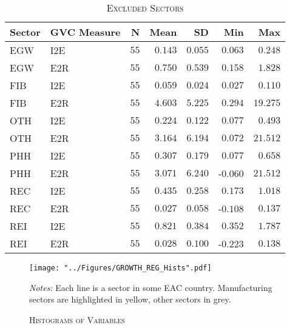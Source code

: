 \documentclass[a4paper]{article}
\begin{document}
\begin{table}[h!]  \vspace{-4mm}
  \centering 
  \caption{\label{tab:EXCL_SEC}\textsc{Excluded Sectors}}
  \vspace{2mm}
\begin{tabular}{ llrrrrr} \toprule
Sector & GVC Measure  & N & Mean & SD & Min & Max \\ 
\midrule
EGW & I2E & $55$ & $0.143$ & $0.055$ & $0.063$ & $0.248$ \\ 
EGW & E2R & $55$ & $0.750$ & $0.539$ & $0.158$ & $1.828$ \\ 
FIB & I2E & $55$ & $0.059$ & $0.024$ & $0.027$ & $0.110$ \\ 
FIB & E2R & $55$ & $4.603$ & $5.225$ & $0.294$ & $19.275$ \\ 
OTH & I2E & $55$ & $0.224$ & $0.122$ & $0.077$ & $0.493$ \\ 
OTH & E2R & $55$ & $3.164$ & $6.194$ & $0.072$ & $21.512$ \\ 
PHH & I2E & $55$ & $0.307$ & $0.179$ & $0.077$ & $0.658$ \\ 
PHH & E2R & $55$ & $3.071$ & $6.240$ & -$0.060$ & $21.512$ \\ 
REC & I2E & $55$ & $0.435$ & $0.258$ & $0.173$ & $1.018$ \\ 
REC & E2R & $55$ & $0.027$ & $0.058$ & -$0.108$ & $0.137$ \\ 
REI & I2E & $55$ & $0.821$ & $0.384$ & $0.352$ & $1.787$ \\ 
REI & E2R & $55$ & $0.028$ & $0.100$ & -$0.223$ & $0.138$ \\ \bottomrule
\end{tabular} 
\end{table} 
\FloatBarrier


\begin{figure}[h!]  \vspace{-2mm}
\centering
\caption{\label{fig:GROWTH_REG_Hists}\textsc{Histograms of Variables}}
\texttt{[image: "../Figures/GROWTH\_REG\_Hists".pdf]} %
\raggedright
\scriptsize
\emph{Notes:} Each line is a sector in some EAC country. Manufacturing sectors are highlighted in yellow, other sectors in grey. 
\vspace{-2cm}
\end{figure}
\FloatBarrier
\end{document}
